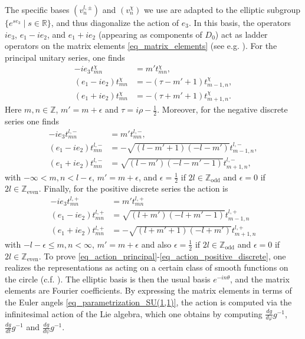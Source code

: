 \documentclass{amsart}
\theoremstyle{definition}
\theoremstyle{remark}
\numberwithin{equation}{section}
\begin{document}
The specific bases $(v_n^{l,\pm})$ and $(v_n^\chi)$ we use are adapted to the elliptic subgroup $\{e^{se_3}\mid s\in\mathbb{R}\}$, and thus diagonalize the action of $e_3$. In this basis, the operators $ie_3$, $e_1-ie_2$, and $e_1+ie_2$ (appearing as components of $D_0$) act as ladder operators on the matrix elements \eqref{eq_matrix_elements} (see e.g. \cite{vilenkin_klimyk_1991}). For the principal unitary series, one finds 
\begin{equation}\label{eq_action_principal}
    \begin{aligned}
        -ie_3t^\chi_{mn}&=m't^\chi_{mn},\\
        (e_1-ie_2)t^\chi_{mn}&=-(\tau-m'+1)t^\chi_{m-1,n},\\
        (e_1+ie_2)t^\chi_{mn}&=-(\tau+m'+1)t^\chi_{m+1,n}.
    \end{aligned}
\end{equation}
Here $m,n\in\mathbb{Z}$, $m'=m+\epsilon$ and $\tau=i\rho-\tfrac{1}{2}$. Moreover, for the negative discrete series one finds
\begin{equation}\label{eq_action_negative_discrete}
    \begin{aligned}
        -ie_3t^{l,-}_{mn}&=m't^{l,-}_{mn},\\
        (e_1-ie_2)t^{l,-}_{mn}&=-\sqrt{(l-m'+1)(-l-m')}t^{l,-}_{m-1,n},\\
        (e_1+ie_2)t^{l,-}_{mn}&=\sqrt{(l-m')(-l-m'-1)}t^{l,-}_{m+1,n},
    \end{aligned}
\end{equation}
with $-\infty<m,n<l-\epsilon$, $m'=m+\epsilon$, and $\epsilon=\tfrac{1}{2}$ if $2l\in\mathbb{Z}_\mathrm{odd}$ and $\epsilon=0$ if $2l\in\mathbb{Z}_\mathrm{even}$. Finally, for the positive discrete series the action is
\begin{equation}\label{eq_action_positive_discrete}
    \begin{aligned}
        -ie_3t^{l,+}_{mn}&=m't^{l,+}_{mn}\\
        (e_1-ie_2)t^{l,+}_{mn}&=\sqrt{(l+m')(-l+m'-1)}t^{l,+}_{m-1,n}\\
        (e_1+ie_2)t^{l,+}_{mn}&=-\sqrt{(l+m'+1)(-l+m')}t^{l,+}_{m+1,n}
    \end{aligned}
\end{equation}
with $-l-\epsilon\leq m,n<\infty$, $m'=m+\epsilon$ and also $\epsilon=\tfrac{1}{2}$ if $2l\in\mathbb{Z}_\mathrm{odd}$ and $\epsilon=0$ if $2l\in\mathbb{Z}_\mathrm{even}$. To prove \eqref{eq_action_principal}-\eqref{eq_action_positive_discrete}, one realizes the representations as acting on a certain class of smooth functions on the circle (c.f. \cite[Section 6.4]{vilenkin_klimyk_1991}). The elliptic basis is then the usual basis $e^{-in\theta}$, and the matrix elements are Fourier coefficients. By expressing the matrix elements in terms of the Euler angels \eqref{eq_parametrization_SU(1,1)}, the action is computed via the infinitesimal action of the Lie algebra, which one obtains by computing $\frac{dg}{d\varphi}g^{-1}$, $\frac{dg}{dt}g^{-1}$ and $\frac{dg}{d\psi}g^{-1}$.
\end{document}
